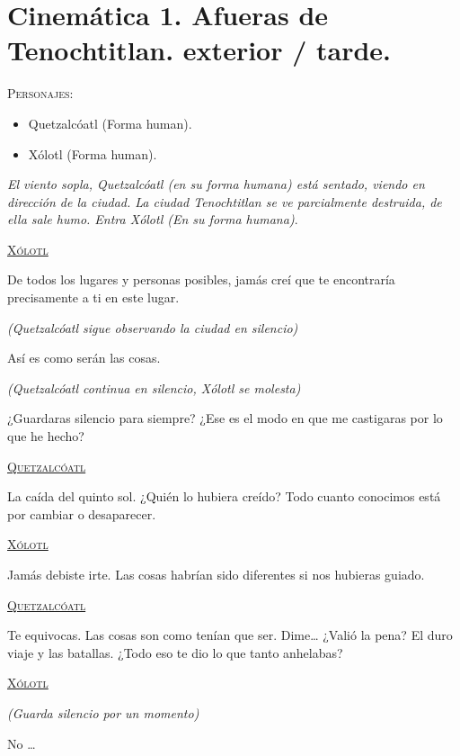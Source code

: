 \section{Cinemática 1. Afueras de Tenochtitlan. exterior / tarde.} \label{Cin:Cinematica01}
	
\textsc{Personajes}:
\begin{itemize}
	\item Quetzalcóatl (Forma human).
	\item Xólotl (Forma human).
\end{itemize}
\textit{El viento sopla, Quetzalcóatl (en su forma humana) está sentado, viendo en dirección de la ciudad. La ciudad Tenochtitlan se ve parcialmente destruida, de ella sale humo. Entra Xólotl (En su forma humana)}.
\begin{center}
\textsc{\underline{Xólotl}}
\par
De todos los lugares y personas posibles, jamás creí que te encontraría precisamente a ti en este lugar.
\par
\textit{(Quetzalcóatl sigue observando la ciudad en silencio)}
\par
Así es como serán las cosas.
\par 
\textit{(Quetzalcóatl continua en silencio, Xólotl se molesta)}
\par
¿Guardaras silencio para siempre? ¿Ese es el modo en que me castigaras por lo que he hecho?
\\
\par
\textsc{\underline{Quetzalcóatl}}
\par
La caída del quinto sol. ¿Quién lo hubiera creído? Todo cuanto conocimos está por cambiar o desaparecer.
\par
\par
\textsc{\underline{Xólotl}}
\\
\par
Jamás debiste irte. Las cosas habrían sido diferentes si nos hubieras guiado.
\\
\par
\textsc{\underline{Quetzalcóatl}}
\par
Te equivocas. Las cosas son como tenían que ser. Dime… ¿Valió la pena? El duro viaje y las batallas. ¿Todo eso te dio lo que tanto anhelabas?
\\
\par
\textsc{\underline{Xólotl}}
\\
\par
\textit{(Guarda silencio por un momento)}
\\
\par
No …
\end{center}